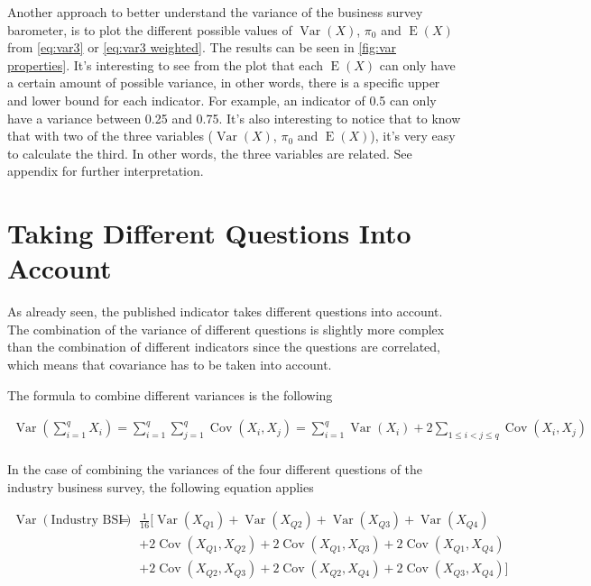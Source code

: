 \documentclass[12pt,a4paper,oneside]{book}
\DeclareMathOperator{\Var}{Var}
\DeclareMathOperator{\Cov}{Cov}
\DeclareMathOperator{\E}{E}
\begin{document}
Another approach to better understand the variance of the business survey barometer, is to plot the different possible values of $\Var(X)$, $\pi_0$ and $\E(X)$ from \autoref{eq:var3} or \autoref{eq:var3 weighted}. The results can be seen in \autoref{fig:var properties}.
It's interesting to see from the plot that each $\E(X)$ can only have a certain amount of possible variance, in other words, there is a specific upper and lower bound for each indicator. For example, an indicator of 0.5 can only have a variance between 0.25 and 0.75.
It's also interesting to notice that to know that with two of the three variables ($\Var(X)$, $\pi_0$ and $\E(X)$), it's very easy to calculate the third. 
In other words, the three variables are related. 
See appendix  for further interpretation.

\section{Taking Different Questions Into Account}

As already seen, the published indicator takes different questions into account. 
The combination of the variance of different questions is slightly more complex than the combination of different indicators since the questions are correlated, which means that covariance has to be taken into account.

The formula to combine different variances is the following

\begin{eqnarray}
\Var \left(\sum_{i=1}^{q} X_{i}\right) = \sum_{i=1}^{q} \sum_{j=1}^{q} \Cov\left(X_{i}, X_{j}\right)
= \sum_{i=1}^{q} \Var\left(X_{i}\right)+2 \sum_{1 \leq i<j \leq q} \Cov\left(X_{i}, X_{j}\right) \label{eq:sum of variances} \\ \nonumber
\end{eqnarray} 

In the case of combining the variances of the four different questions of the industry business survey, the following equation applies

\begin{eqnarray}
    \Var \left( \text{Industry BSI} \right) 
    &=& \frac{1}{16} \Big[ \Var(X_{Q1}) + \Var(X_{Q2}) + \Var(X_{Q3}) + \Var(X_{Q4}) \nonumber \\
    && + 2 \Cov (X_{Q1},X_{Q2}) + 2 \Cov (X_{Q1},X_{Q3}) + 2 \Cov (X_{Q1},X_{Q4}) \nonumber \\
    &&  + 2 \Cov (X_{Q2},X_{Q3}) + 2 \Cov (X_{Q2},X_{Q4}) + 2 \Cov (X_{Q3},X_{Q4}) \Big] \nonumber \\
\end{eqnarray}
\end{document}
